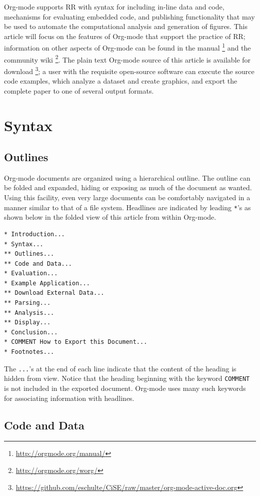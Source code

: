 \documentclass[11pt]{article}
\begin{document}
Org-mode supports RR with syntax for including in-line data and code,
mechanisms for evaluating embedded code, and publishing functionality
that may be used to automate the computational analysis and generation
of figures.  This article will focus on the features of Org-mode
that support the practice of RR; information on other aspects of
Org-mode can be found in the manual \cite{org-manual} \footnote{\href{http://orgmode.org/manual/}{http://orgmode.org/manual/} } and the
community wiki \footnote{\href{http://orgmode.org/worg/}{http://orgmode.org/worg/} }.  The plain text Org-mode source of this
article is available for download \footnote{\href{https://github.com/eschulte/CiSE/raw/master/org-mode-active-doc.org}{https://github.com/eschulte/CiSE/raw/master/org-mode-active-doc.org} }; a user with the requisite
open-source software can
execute the source code examples, which analyze a dataset and create
graphics, and export the complete paper to one of several output
formats.
\section{Syntax}
\label{sec-2}
\subsection{Outlines}
\label{sec-2_1}

Org-mode documents are organized using a hierarchical outline.  The
outline can be folded and expanded, hiding or exposing as much of the
document as wanted.  Using this facility, even very
large documents can be comfortably navigated in a manner similar to
that of a file system.  Headlines are indicated by leading \texttt{*}'s as
shown below in the folded view of this article from within Org-mode.


\begin{verbatim}
* Introduction...
* Syntax...
** Outlines...
** Code and Data...
* Evaluation...
* Example Application...
** Download External Data...
** Parsing...
** Analysis...
** Display...
* Conclusion...
* COMMENT How to Export this Document...
* Footnotes...
\end{verbatim}

The \texttt{...}'s at the end of each line indicate that the content of the
heading is hidden from view.  Notice that the heading beginning with
the keyword \texttt{COMMENT} is not included in the exported document.
Org-mode uses many such keywords for associating information with
headlines.
\subsection{Code and Data}
\label{sec-2_2}
\end{document}
